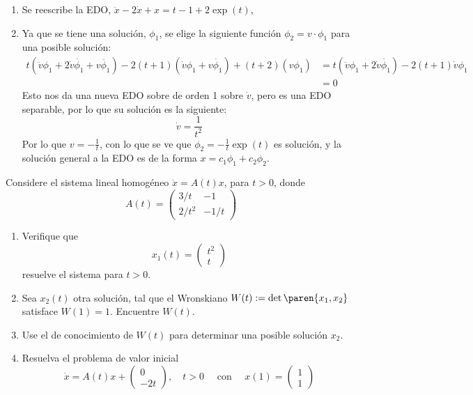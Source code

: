 \documentclass{homework}
\begin{document}
\begin{sol}
\begin{enumerate}[label=(\alph*)]
        \item Se reescribe la EDO, \(\ddot{x}-2\dot{x}+x=t-1+2\exp(t)\), 
        \item Ya que se tiene una solución, \(\phi_1\), se elige la siguiente función \(\phi_2=v\cdot \phi_1\) para una posible solución:
        \begin{align*}
            t(\ddot{v}\phi_1+2\dot{v}\dot{\phi_1}+v\ddot{\phi_1})-2(t+1)(\dot{v}\phi_1+v\dot{\phi_1})+(t+2)(v\phi_1)&=t(\ddot{v}\phi_1+2\dot{v}\dot{\phi_1})-2(t+1)\dot{v}\phi_1\\
            &=0
        \end{align*}
        Esto nos da una nueva EDO sobre de orden 1 sobre \(\dot{v}\), pero es una EDO separable, por lo que su solución es la siguiente:
        \begin{equation*}
            \dot{v}=\frac1{t^2}
        \end{equation*}
        Por lo que \(v=-\frac1t\), con lo que se ve que \(\phi_2=-\frac1t\exp(t)\) es solución, y la solución general a la EDO es de la forma \(x=c_1\phi_1+c_2\phi_2\).
    \end{enumerate}
\end{sol}

\begin{prob}
    Considere el sistema lineal homogéneo \(\dot{x}=A(t)x\), para \(t>0\), donde
    \[A(t)=\begin{pmatrix}
        3/t&-1\\2/t^2&-1/t
    \end{pmatrix}\]
    \begin{enumerate}[label=(\alph*)]
        \item Verifique que
        \[x_1(t)=\begin{pmatrix}
            t^2\\t
        \end{pmatrix}\]
        resuelve el sistema para \(t>0\).
        \item Sea \(x_2(t)\) otra solución, tal que el Wronskiano \(W(t):=\det\paren{x_1,x_2}\) satisface \(W(1)=1\). Encuentre \(W(t)\).
        \item Use el de conocimiento de \(W(t)\) para determinar una posible solución \(x_2\).
        \item Resuelva el problema de valor inicial
        \[\dot{x}=A(t)x+\begin{pmatrix}
            0\\-2t
        \end{pmatrix},\quad t>0\quad\text{ con }\quad x(1)=\begin{pmatrix}
            1\\1
        \end{pmatrix}\]
    \end{enumerate}
\end{prob}
\end{document}
